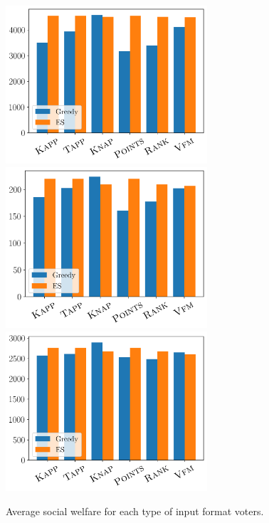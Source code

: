 \documentclass[10pt]{article}
\begin{document}
\begin{appendices}
\begin{figure}[!htbp]
\begin{center}
\includegraphics[width=7.5cm]{experiment/Ranking_value_money_welfare.png}
\includegraphics[width=7.5cm]{experiment/Threshold_welfare.png}
\includegraphics[width=7.5cm]{experiment/Utilities_welfare.png}
\caption{Average social welfare for each type of input format voters.
}\label{fig:all_welfare}
\end{center}
\end{figure}


\end{appendices}
\end{document}
